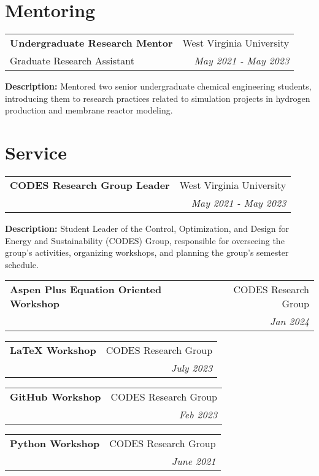 \documentclass[letterpaper,12pt]{article}
\makeatletter
\newcommand{\resumeTeachingHeading}[4]{
	 \vspace{-2pt}\item
	\begin{tabular*}{0.97\textwidth}[t]{l@{\extracolsep{\fill}}r}
		\textbf{#1} & #2 \\
		{#3} & \textit{\small #4} \\
	\end{tabular*}\vspace{-7pt}
}
\newcommand{\resumeSubHeadingListStart}{\begin{itemize}[leftmargin=0.15in, label={}]}
\newcommand{\resumeSubHeadingListEnd}{\end{itemize}}
\makeatother
\begin{document}
\section{Mentoring}
\vspace{3pt}
\resumeSubHeadingListStart
\resumeTeachingHeading{Undergraduate Research Mentor}{West Virginia University}{Graduate Research Assistant}{May 2021 - May 2023}
\small{\item{
        \textbf{Description: }{Mentored two senior undergraduate chemical engineering students, introducing them to research practices related to simulation projects in hydrogen production and membrane reactor modeling.} \\ \vspace{3pt}
        
    }}

\resumeSubHeadingListEnd


\section{Service}
\vspace{3pt}
\resumeSubHeadingListStart
\resumeTeachingHeading{CODES Research Group Leader}{West Virginia University}{}{May 2021 - May 2023}
{\item{
        \textbf{Description: }{Student Leader of the Control, Optimization, and Design for Energy and Sustainability (CODES) Group, responsible for overseeing the group's activities, organizing workshops, and planning the group's semester schedule.} \\ \vspace{3pt}
        
    }}

\resumeTeachingHeading{Aspen Plus Equation Oriented Workshop}{CODES Research Group }{}{Jan 2024}

\resumeTeachingHeading{LaTeX Workshop}{CODES Research Group }{}{July 2023}

\resumeTeachingHeading{GitHub Workshop}{CODES Research Group }{}{Feb 2023}

\resumeTeachingHeading{Python Workshop}{CODES Research Group }{}{June 2021}

\resumeSubHeadingListEnd


    
\end{document}
